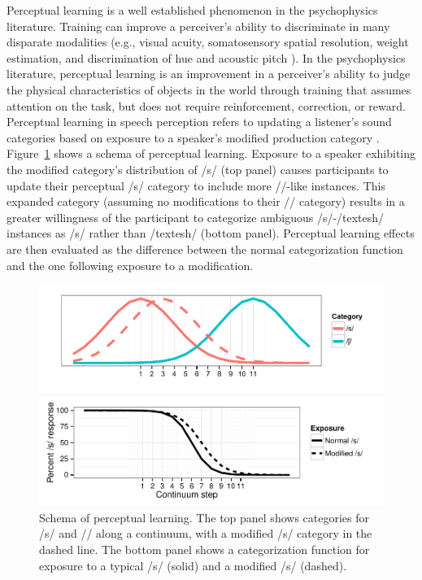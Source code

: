 Perceptual learning is a well established phenomenon in the psychophysics literature. 
Training can improve a perceiver's ability to discriminate in many disparate modalities (e.g., visual acuity, somatosensory spatial resolution, weight estimation, and discrimination of hue and acoustic pitch \citep[see][for review]{Gibson1953}). 
In the psychophysics literature, perceptual learning is an improvement in a perceiver's ability to judge the physical characteristics of objects in the world through training that assumes attention on the task, but does not require reinforcement, correction, or reward.
Perceptual learning in speech perception refers to updating a listener's sound categories based on exposure to a speaker's modified production category \citep{Norris2003, Vroomen2007}.
Figure~\ref{fig:perceptuallearning} shows a schema of perceptual learning.
Exposure to a speaker exhibiting the modified category's distribution of /s/ (top panel) causes participants to update their perceptual /s/ category to include more /\textesh/-like instances.
This expanded category (assuming no modifications to their /\textesh/ category) results in a greater willingness of the participant to categorize ambiguous /s/-/textesh/ instances as /s/ rather than /textesh/ (bottom panel).
Perceptual learning effects are then evaluated as the difference between the normal categorization function and the one following exposure to a modification.

\begin{figure}[!ht]
\caption{Schema of perceptual learning.  The top panel shows categories for /s/ and /\textesh/ along a continuum, with a modified /s/ category in the dashed line. The bottom panel shows a categorization function for exposure to a typical /s/ (solid) and a modified /s/ (dashed).}
\label{fig:perceptuallearning}
\includegraphics[width=1.0\textwidth]{graphs/dist}

\includegraphics[width=1.0\textwidth]{graphs/class}
\end{figure}

